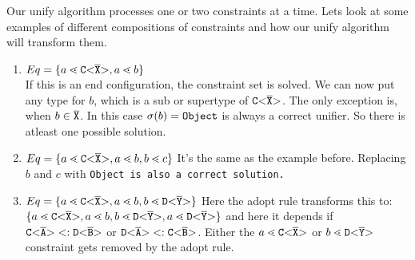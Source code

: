 Our unify algorithm processes one or two constraints at a time.
Lets look at some examples of different compositions of constraints
and how our unify algorithm will transform them.

\begin{enumerate}
\item $Eq = \{ a \lessdot \mathtt{C {\tt <} \overline{\tt X} {\tt >} }, a \lessdot b \}$ \\
If this is an end configuration, the constraint set is solved.
We can now put any type for $b$, which is a sub or supertype of $\mathtt{C {\tt <} \overline{\tt X} {\tt >} }$.
The only exception is, when $b \in \overline{\tt X}$.
In this case $\sigma(b) = \tt{Object}$ is always a correct unifier.
So there is atleast one possible solution.

\item $Eq = \{ a \lessdot \mathtt{C {\tt <} \overline{\tt X} {\tt >} }, a \lessdot b, b \lessdot c \}$
It's the same as the example before.
Replacing $b$ and $c$ with \tt{Object} is also a correct solution. 

\item $Eq = \{ a \lessdot \mathtt{C {\tt <} \overline{\tt X} {\tt >} }, a \lessdot b, b \lessdot \mathtt{D {\tt <} \overline{\tt Y} {\tt >} } \}$
Here the adopt rule transforms this to:
$\{ a \lessdot \mathtt{C {\tt <} \overline{\tt X} {\tt >} }, a \lessdot b, b \lessdot \mathtt{D {\tt <} \overline{\tt Y} {\tt >} }, a \lessdot \mathtt{D {\tt <} \overline{\tt Y} {\tt >} } \}$
and here it depends if $\mathtt{C {\tt <} \overline{\tt A} {\tt >} } <: \mathtt{D {\tt <} \overline{\tt B} {\tt >} }$ or $\mathtt{D {\tt <} \overline{\tt A} {\tt >} } <: \mathtt{C {\tt <} \overline{\tt B} {\tt >} }$.
Either the $a \lessdot \mathtt{C {\tt <} \overline{\tt X} {\tt >} }$ or $b \lessdot \mathtt{D {\tt <} \overline{\tt Y} {\tt >} }$ constraint
gets removed by the adopt rule.


\end{enumerate}
